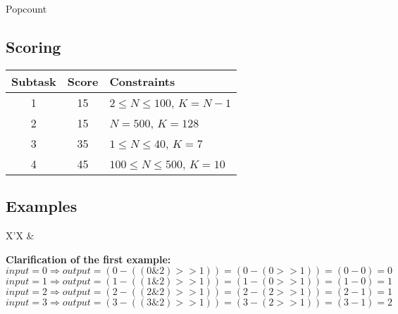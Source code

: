 \begin{statement}[
  problempoints=110,
  timelimit=1 second,
  memorylimit=512 MiB,
]{Popcount}
\subsection*{Scoring}
{\renewcommand{\arraystretch}{1.4}
  \setlength{\tabcolsep}{6pt}
  \begin{tabular}{ccl}
 Subtask & Score & Constraints \\ \midrule
  1 & 15 & $2 \le N \le 100$, $K = N - 1$ \\
  2 & 15 & $N = 500$, $K = 128$ \\
  3 & 35 & $1 \le N \le 40$, $K=7$ \\
  4 & 45 & $100 \le N \le 500$, $K=10$
\end{tabular}}

\subsection*{Examples}
\begin{tabularx}{\textwidth}{X'X}
 &
\end{tabularx}

\textbf{Clarification of the first example:} \\
$input=0 \Rightarrow output=(0-((0\&2)>>1))=(0-(0>>1))=(0-0)=0$\\
$input=1 \Rightarrow output=(1-((1\&2)>>1))=(1-(0>>1))=(1-0)=1$\\
$input=2 \Rightarrow output=(2-((2\&2)>>1))=(2-(2>>1))=(2-1)=1$\\
$input=3 \Rightarrow output=(3-((3\&2)>>1))=(3-(2>>1))=(3-1)=2$

\end{statement}

